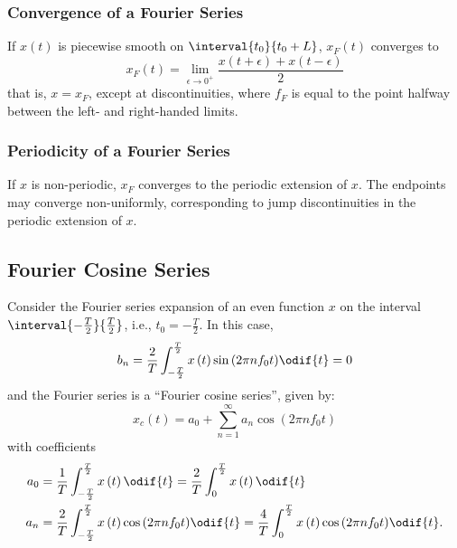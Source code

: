 \documentclass{article}
\begin{document}
\subsubsection{Convergence of a Fourier Series}
If \(x\left( t \right)\) is piecewise smooth on \(\interval{t_0}{t_0 + L}\), \(x_F\left( t \right)\)
converges to
\begin{equation*}
    x_F\left( t \right) = \lim_{\epsilon \to 0^{+}} \frac{x\left( t + \epsilon \right) + x\left( t - \epsilon \right)}{2}
\end{equation*}
that is, \(x = x_F\), except at discontinuities, where \(f_F\) is equal to the point halfway between the left- and right-handed limits.
\subsubsection{Periodicity of a Fourier Series}
If \(x\) is non-periodic, \(x_F\) converges to the periodic extension of \(x\). The endpoints may converge non-uniformly,
corresponding to jump discontinuities in the periodic extension of \(x\).
\subsection{Fourier Cosine Series}
Consider the Fourier series expansion of an even function \(x\) on the interval \(\interval{-\frac{T}{2}}{\frac{T}{2}}\), i.e., \(t_0 = -\frac{T}{2}\).
In this case,
\begin{equation*}
    b_n = \frac{2}{T} \int_{-\frac{T}{2}}^{\frac{T}{2}} x\left( t \right) \sin{\left( 2\pi n f_0 t \right)} \odif{t} = 0
\end{equation*}
and the Fourier series is a ``Fourier cosine series'', given by:
\begin{equation*}
    x_c\left( t \right) = a_0 + \sum_{n = 1}^\infty a_n \cos{\left( 2\pi n f_0 t \right)}
\end{equation*}
with coefficients
\begin{align*}
    a_0 & = \frac{1}{T} \int_{-\frac{T}{2}}^{\frac{T}{2}} x\left( t \right) \odif{t}                                    = \frac{2}{T} \int_0^{\frac{T}{2}} x\left( t \right) \odif{t}                                    \\
    a_n & = \frac{2}{T} \int_{-\frac{T}{2}}^{\frac{T}{2}} x\left( t \right) \cos{\left( 2 \pi n f_0 t \right)} \odif{t} = \frac{4}{T} \int_0^{\frac{T}{2}} x\left( t \right) \cos{\left( 2\pi n f_0 t \right)} \odif{t}.
\end{align*}
\end{document}
